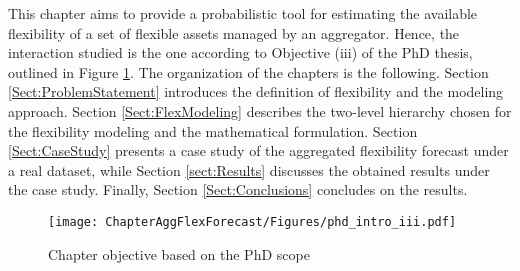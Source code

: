 This chapter aims to provide a probabilistic tool for estimating the available flexibility of a set of flexible assets managed by an aggregator. Hence, the interaction studied is the one according to Objective (iii) of the PhD thesis, outlined in Figure \ref{fig:chapter_obj_ii}. The organization of the chapters is the following. Section \ref{Sect:ProblemStatement} introduces the definition of flexibility and the modeling approach. Section \ref{Sect:FlexModeling} describes the two-level hierarchy chosen for the flexibility modeling and the mathematical formulation. Section \ref{Sect:CaseStudy} presents a case study of the aggregated flexibility forecast under a real dataset, while Section \ref{sect:Results} discusses the obtained results under the case study. Finally, Section \ref{Sect:Conclusions} concludes on the results.

\begin{figure}[h]
	\centering
	\texttt{[image: ChapterAggFlexForecast/Figures/phd\_intro\_iii.pdf]}
		\caption{Chapter objective based on the PhD scope}
	\label{fig:chapter_obj_ii}  
\end{figure}

